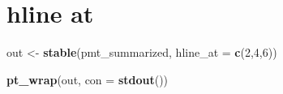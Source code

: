 \documentclass[
]{article}
\newenvironment{Shaded}{\begin{snugshade}}{\end{snugshade}}
\newcommand{\ControlFlowTok}[1]{\textcolor[rgb]{0.13,0.29,0.53}{\textbf{#1}}}
\newcommand{\DataTypeTok}[1]{\textcolor[rgb]{0.13,0.29,0.53}{#1}}
\newcommand{\DecValTok}[1]{\textcolor[rgb]{0.00,0.00,0.81}{#1}}
\newcommand{\KeywordTok}[1]{\textcolor[rgb]{0.13,0.29,0.53}{\textbf{#1}}}
\newcommand{\NormalTok}[1]{#1}
\newcommand{\OperatorTok}[1]{\textcolor[rgb]{0.81,0.36,0.00}{\textbf{#1}}}
\newcommand{\StringTok}[1]{\textcolor[rgb]{0.31,0.60,0.02}{#1}}
\begin{document}
\begin{Shaded}
\end{Shaded}

\clearpage

\hypertarget{hline-at}{%
\section{hline at}\label{hline-at}}

\begin{Shaded}
\begin{Highlighting}[]
\NormalTok{out <-}\StringTok{ }\KeywordTok{stable}\NormalTok{(pmt_summarized, }\DataTypeTok{hline_at =} \KeywordTok{c}\NormalTok{(}\DecValTok{2}\NormalTok{,}\DecValTok{4}\NormalTok{,}\DecValTok{6}\NormalTok{))}

\KeywordTok{pt_wrap}\NormalTok{(out, }\DataTypeTok{con =} \KeywordTok{stdout}\NormalTok{()) }
\end{Highlighting}
\end{Shaded}
\end{document}
